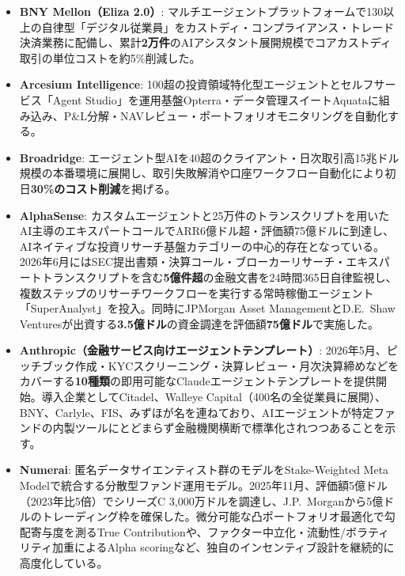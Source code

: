 \begin{itemize}
  \item \textbf{BNY Mellon（Eliza 2.0）}: マルチエージェントプラットフォームで130以上の自律型「デジタル従業員」をカストディ・コンプライアンス・トレード決済業務に配備し、累計\textbf{2万件}のAIアシスタント展開規模でコアカストディ取引の単位コストを約5\%削減した\cite{bnymellon2026}。
  \item \textbf{Arcesium Intelligence}: 100超の投資領域特化型エージェントとセルフサービス「Agent Studio」を運用基盤Opterra・データ管理スイートAquataに組み込み、P\&L分解・NAVレビュー・ポートフォリオモニタリングを自動化する\cite{arcesium2026}。
  \item \textbf{Broadridge}: エージェント型AIを40超のクライアント・日次取引高15兆ドル規模の本番環境に展開し、取引失敗解消や口座ワークフロー自動化により初日\textbf{30\%のコスト削減}を掲げる\cite{broadridge2026}。
  \item \textbf{AlphaSense}: カスタムエージェントと25万件のトランスクリプトを用いたAI主導のエキスパートコールでARR6億ドル超・評価額75億ドルに到達し、AIネイティブな投資リサーチ基盤カテゴリーの中心的存在となっている\cite{alphasense2026}。2026年6月にはSEC提出書類・決算コール・ブローカーリサーチ・エキスパートトランスクリプトを含む\textbf{5億件超}の金融文書を24時間365日自律監視し、複数ステップのリサーチワークフローを実行する常時稼働エージェント「SuperAnalyst」を投入。同時にJPMorgan Asset ManagementとD.E.\ Shaw Venturesが出資する\textbf{3.5億ドル}の資金調達を評価額\textbf{75億ドル}で実施した\cite{alphasensesuper2026}。
  \item \textbf{Anthropic（金融サービス向けエージェントテンプレート）}: 2026年5月、ピッチブック作成・KYCスクリーニング・決算レビュー・月次決算締めなどをカバーする\textbf{10種類}の即用可能なClaudeエージェントテンプレートを提供開始。導入企業としてCitadel、Walleye Capital（400名の全従業員に展開）、BNY、Carlyle、FIS、みずほが名を連ねており、AIエージェントが特定ファンドの内製ツールにとどまらず金融機関横断で標準化されつつあることを示す\cite{anthropicfinanceagents2026}。
  \item \textbf{Numerai}: 匿名データサイエンティスト群のモデルをStake-Weighted Meta Modelで統合する分散型ファンド運用モデル。2025年11月、評価額5億ドル（2023年比5倍）でシリーズC 3,000万ドルを調達し、J.P.\ Morganから5億ドルのトレーディング枠を確保した\cite{numerai_seriesc2025}。微分可能な凸ポートフォリオ最適化で勾配寄与度を測るTrue Contribution\cite{numerai_alien_nd}や、ファクター中立化・流動性/ボラティリティ加重によるAlpha scoring\cite{numerai_alpha_nd}など、独自のインセンティブ設計を継続的に高度化している。
\end{itemize}

